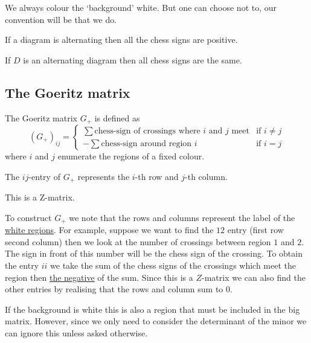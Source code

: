 \documentclass[12pt, a4paper]{article}
\begin{document}
\begin{mdremark}
    We always colour the `background' white. But one can choose not to, our convention will be that we do.
\end{mdremark}

\begin{mdremark}
    If a diagram is alternating then all the chess signs are positive.
\end{mdremark}

\begin{mdcor}
    If \(D\) is an alternating diagram then all chess signs are the same.
\end{mdcor}

\subsection{The Goeritz matrix}

\begin{definition}
    The Goeritz matrix \(G_+\) is defined as 
    \[(G_+)_{ij}=\begin{cases}
        \sum \text{chess-sign of crossings where } i \text{ and } j \text{ meet} &\text{if } i\neq j \\
        -\sum \text{chess-sign around region } i &\text{if } i=j
    \end{cases}\]
    where \(i\) and \(j\) enumerate the regions of a fixed colour.
\end{definition}

\begin{mdremark}
    The \(ij\)-entry of \(G_+\) represents the \(i\)-th row and \(j\)-th column.
\end{mdremark}

\begin{mdremark}
    This is a Z-matrix.
\end{mdremark}

To construct \(G_+\) we note that the rows and columns represent the label of the \ul{white regions}. For example, suppose we want to find the \(12\) entry (first row second column) then we look at the number of crossings between region \(1\) and \(2\). The sign in front of this number will be the chess sign of the crossing. To obtain the entry \(ii\) we take the sum of the chess signs of the crossings which meet the region then \ul{the negative} of the sum. 
Since this is a \(Z\)-matrix we can also find the other entries by realising that the rows and column sum to \(0\). 

If the background is white this is also a region that must be included in the big matrix. However, since we only need to consider the determinant of the minor we can ignore this unless asked otherwise.
\end{document}
